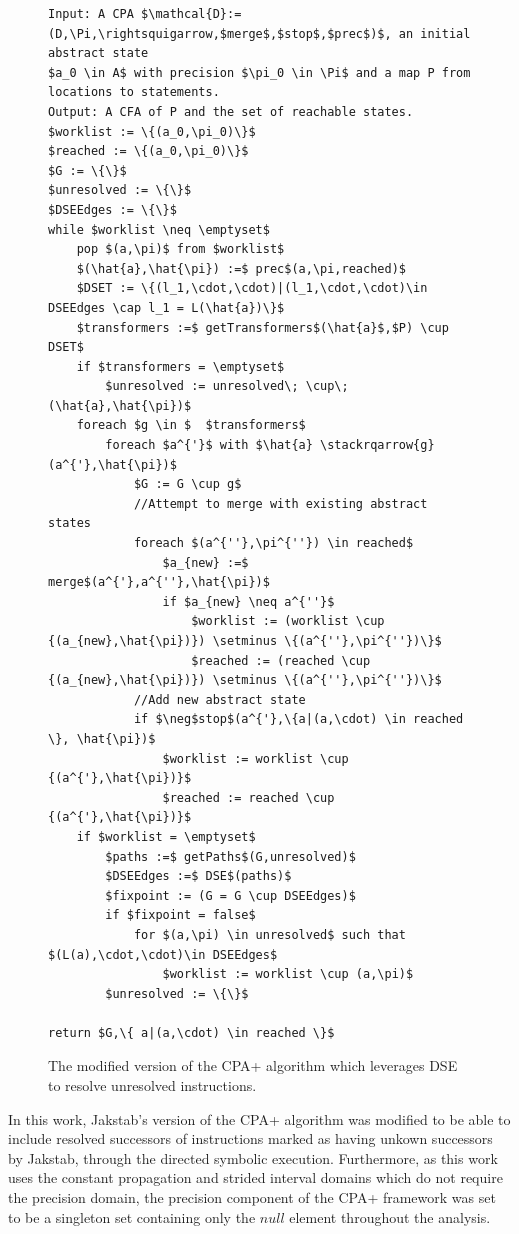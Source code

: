 \documentclass{kththesis}
\newcommand\stackrqarrow[1]{%
    \mathrel{\stackon[2pt]{$\rightsquigarrow$}{$\scriptscriptstyle#1$}}}
\begin{document}
\begin{figure}[htb]
    \centering
\begin{algorithmFrame}
\begin{lstlisting}[style=algorithm]
Input: A CPA $\mathcal{D}:=(D,\Pi,\rightsquigarrow,$merge$,$stop$,$prec$)$, an initial abstract state
$a_0 \in A$ with precision $\pi_0 \in \Pi$ and a map P from locations to statements.
Output: A CFA of P and the set of reachable states.
$worklist := \{(a_0,\pi_0)\}$
$reached := \{(a_0,\pi_0)\}$
$G := \{\}$
$unresolved := \{\}$
$DSEEdges := \{\}$
while $worklist \neq \emptyset$ 
    pop $(a,\pi)$ from $worklist$
    $(\hat{a},\hat{\pi}) :=$ prec$(a,\pi,reached)$
    $DSET := \{(l_1,\cdot,\cdot)|(l_1,\cdot,\cdot)\in DSEEdges \cap l_1 = L(\hat{a})\}$
    $transformers :=$ getTransformers$(\hat{a}$,$P) \cup DSET$
    if $transformers = \emptyset$
        $unresolved := unresolved\; \cup\; (\hat{a},\hat{\pi})$
    foreach $g \in $  $transformers$ 
        foreach $a^{'}$ with $\hat{a} \stackrqarrow{g} (a^{'},\hat{\pi})$
            $G := G \cup g$
            //Attempt to merge with existing abstract states
            foreach $(a^{''},\pi^{''}) \in reached$
                $a_{new} :=$ merge$(a^{'},a^{''},\hat{\pi})$
                if $a_{new} \neq a^{''}$
                    $worklist := (worklist \cup {(a_{new},\hat{\pi})}) \setminus \{(a^{''},\pi^{''})\}$
                    $reached := (reached \cup {(a_{new},\hat{\pi})}) \setminus \{(a^{''},\pi^{''})\}$
            //Add new abstract state
            if $\neg$stop$(a^{'},\{a|(a,\cdot) \in reached \}, \hat{\pi})$
                $worklist := worklist \cup {(a^{'},\hat{\pi})}$
                $reached := reached \cup {(a^{'},\hat{\pi})}$
    if $worklist = \emptyset$
        $paths :=$ getPaths$(G,unresolved)$
        $DSEEdges :=$ DSE$(paths)$
        $fixpoint := (G = G \cup DSEEdges)$
        if $fixpoint = false$
            for $(a,\pi) \in unresolved$ such that $(L(a),\cdot,\cdot)\in DSEEdges$
                $worklist := worklist \cup (a,\pi)$
        $unresolved := \{\}$
            
return $G,\{ a|(a,\cdot) \in reached \}$
\end{lstlisting}
\end{algorithmFrame}
\caption[The modified version of the CPA+ algorithm which leverages DSE to resolve unresolved instructions.]{The modified version of the CPA+ algorithm which leverages DSE to resolve unresolved instructions.}
    \label{fig:ACFR1}
\end{figure}
\clearpage
\noindent
In this work, Jakstab's version of the CPA+ algorithm was modified to be able to include resolved successors of instructions marked as having unkown successors by Jakstab, through the directed symbolic execution. Furthermore, as this work uses the constant propagation and strided interval domains which do not require the precision domain, the precision component of the CPA+ framework was set to be a singleton set containing only the $null$ element throughout the analysis.
\end{document}
